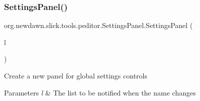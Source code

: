 \subsubsection{\texorpdfstring{Settings\+Panel()}{SettingsPanel()}}
{\footnotesize\ttfamily org.\+newdawn.\+slick.\+tools.\+peditor.\+Settings\+Panel.\+Settings\+Panel (\begin{DoxyParamCaption}\item[{\mbox{\hyperlink{classorg_1_1newdawn_1_1slick_1_1tools_1_1peditor_1_1_emitter_list}{Emitter\+List}}}]{l }\end{DoxyParamCaption})\hspace{0.3cm}{\ttfamily [inline]}}

Create a new panel for global settings controls


\begin{DoxyParams}{Parameters}
{\em l} & The list to be notified when the name changes \\
\hline
\end{DoxyParams}

